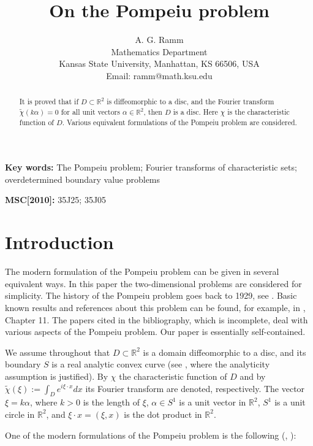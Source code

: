 \documentclass[final,11pt]{article}
\title{On the Pompeiu problem}
\author{A. G. Ramm\\
\small Mathematics Department \\
\small Kansas State University, Manhattan, KS 66506, USA \\
\small Email: ramm@math.ksu.edu}
\date{}
\def\R{\mathbb{R}}
\begin{document}
\maketitle

\begin{abstract}
It is proved that if $D\subset \R^2$ is diffeomorphic to a disc,
and the Fourier transform $\tilde{\chi}(k\alpha)=0$ for
all unit vectors $\alpha\in \R^2$, then $D$ is a disc. Here
$\chi$ is the characteristic function of $D$.
Various equivalent formulations of the Pompeiu problem are considered.
\end{abstract}

\noindent\textbf{Key words:}
The Pompeiu problem; Fourier transforms of characteristic sets;
overdetermined boundary value problems

\noindent\textbf{MSC[2010]:}  35J25; 35J05

\section{Introduction} \label{Introduction}

The modern formulation of the Pompeiu problem can be given in
several equivalent ways. In this paper the two-dimensional problems
are considered for simplicity. The history of the Pompeiu problem goes
back to 1929, see \cite{P}. Basic known results and references
about this problem can be found, for example, in \cite{R470}, Chapter 11.
The papers cited in the bibliography, which is incomplete,
 deal with various aspects of the Pompeiu problem. Our paper is essentially
 self-contained.

We
assume throughout that $D\subset \R^2$ is a domain diffeomorphic to a
disc, and its boundary $S$ is a real analytic convex curve (see \cite{W},
where the analyticity assumption is justified).
By $\chi$ the characteristic
function of $D$ and by $\tilde{\chi}(\xi):=\int_De^{i\xi\cdot x}dx$
its Fourier transform are denoted, respectively. The vector
$\xi=k\alpha$, where $k>0$ is the length of $\xi$, $\alpha\in S^1$
is a unit vector in $\R^2$, $S^1$ is a unit circle in $\R^2$, and
$\xi\cdot x=(\xi, x)$ is the dot product in $\R^2$.

One of the modern formulations of the Pompeiu problem is the
following (\cite{R470}, \cite{R629}):
\end{document}
